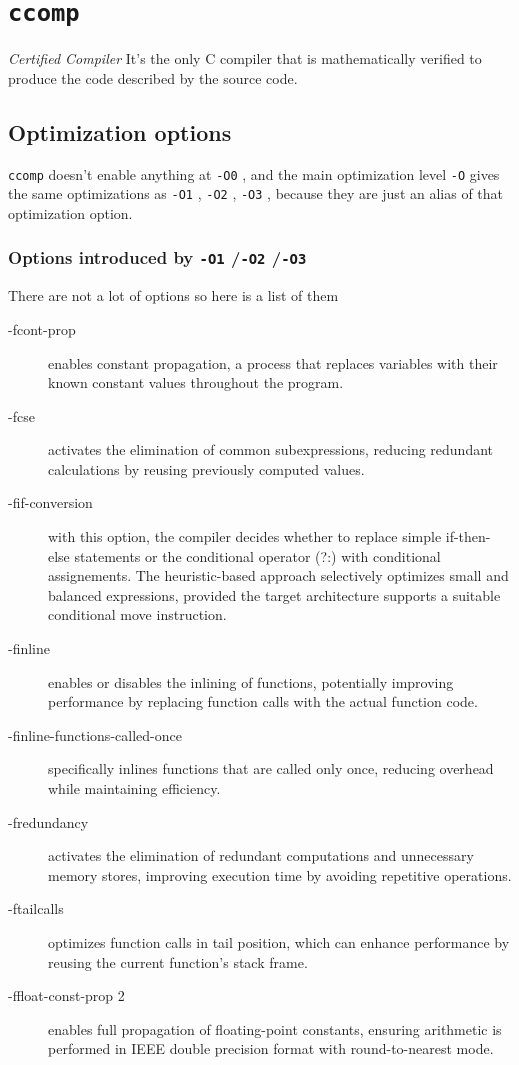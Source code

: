 \documentclass{rapport}
\newcommand{\comp}{\texttt{ccomp} }
\newcommand{\optizero}{\texttt{-O0} }
\newcommand{\optione}{\texttt{-O1} }
\newcommand{\optitwo}{\texttt{-O2} }
\newcommand{\optithree}{\texttt{-O3} }
\begin{document}
\section{\comp}
\textit{Certified Compiler}\newline
It's the only C compiler that is mathematically verified to produce the code described by the source code. 
\subsection{Optimization options}
\comp doesn't enable anything at \optizero, and the main optimization level \texttt{-O} gives the same optimizations as \optione, \optitwo, \optithree, because they are just an alias of that optimization option.
\subsubsection{Options introduced by \optione/\optitwo/\optithree}
There are not a lot of options so here is a list of them

\begin{description}
    \item[-fcont-prop] enables constant propagation, a process that replaces variables with their known constant values throughout the program.
    \item[-fcse] activates the elimination of common subexpressions, reducing redundant calculations by reusing previously computed values.
    \item[-fif-conversion] with this option, the compiler decides whether to replace simple if-then-else statements or the conditional operator (?:) with conditional assignements.\newline
    The heuristic-based approach selectively optimizes small and balanced expressions, provided the target architecture supports a suitable conditional move instruction.
    \item[-finline]  enables or disables the inlining of functions, potentially improving performance by replacing function calls with the actual function code.
    \item[-finline-functions-called-once] specifically inlines functions that are called only once, reducing overhead while maintaining efficiency.
    \item[-fredundancy] activates the elimination of redundant computations and unnecessary memory stores, improving execution time by avoiding repetitive operations.
    \item[-ftailcalls] optimizes function calls in tail position, which can enhance performance by reusing the current function’s stack frame. 
    \item[-ffloat-const-prop 2] enables full propagation of floating-point constants, ensuring arithmetic is performed in IEEE double precision format with round-to-nearest mode.
\end{description}
\end{document}
